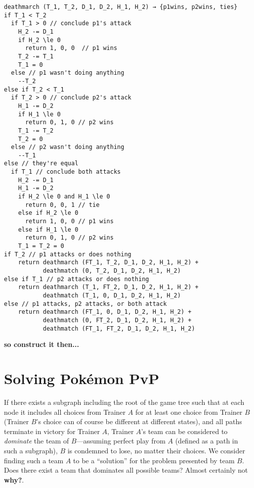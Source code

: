 \begin{verbatim}
deathmarch (T_1, T_2, D_1, D_2, H_1, H_2) → {p1wins, p2wins, ties}
if T_1 < T_2
  if T_1 > 0 // conclude p1's attack
    H_2 -= D_1
    if H_2 \le 0
      return 1, 0, 0  // p1 wins
    T_2 -= T_1
    T_1 = 0
  else // p1 wasn't doing anything
    --T_2
else if T_2 < T_1
  if T_2 > 0 // conclude p2's attack
    H_1 -= D_2
    if H_1 \le 0
      return 0, 1, 0 // p2 wins
    T_1 -= T_2
    T_2 = 0
  else // p2 wasn't doing anything
    --T_1
else // they're equal
  if T_1 // conclude both attacks
    H_2 -= D_1
    H_1 -= D_2
    if H_2 \le 0 and H_1 \le 0
      return 0, 0, 1 // tie
    else if H_2 \le 0
      return 1, 0, 0 // p1 wins
    else if H_1 \le 0
      return 0, 1, 0 // p2 wins
    T_1 = T_2 = 0
if T_2 // p1 attacks or does nothing
    return deathmarch (FT_1, T_2, D_1, D_2, H_1, H_2) +
           deathmatch (0, T_2, D_1, D_2, H_1, H_2)
else if T_1 // p2 attacks or does nothing
    return deathmarch (T_1, FT_2, D_1, D_2, H_1, H_2) +
           deathmatch (T_1, 0, D_1, D_2, H_1, H_2)
else // p1 attacks, p2 attacks, or both attack
    return deathmarch (FT_1, 0, D_1, D_2, H_1, H_2) +
           deathmatch (0, FT_2, D_1, D_2, H_1, H_2) +
           deathmatch (FT_1, FT_2, D_1, D_2, H_1, H_2)
\end{verbatim}

\textbf{so construct it then...}

\section{Solving Pokémon PvP}
If there exists a subgraph including the root of the game tree such that at each
  node it includes all choices from Trainer $A$ for at least one choice from Trainer $B$
  (Trainer $B$'s choice can of course be different at different states), and all
  paths terminate in victory for Trainer $A$, Trainer $A$'s team can be considered
  to \textit{dominate} the team of $B$---assuming perfect play from $A$ (defined
  as a path in such a subgraph), $B$ is condemned to lose, no matter their choices.
We consider finding such a team $A$ to be a ``solution'' for the problem presented
  by team $B$.
Does there exist a team that dominates all possible teams?
Almost certainly not \textbf{why?}.
